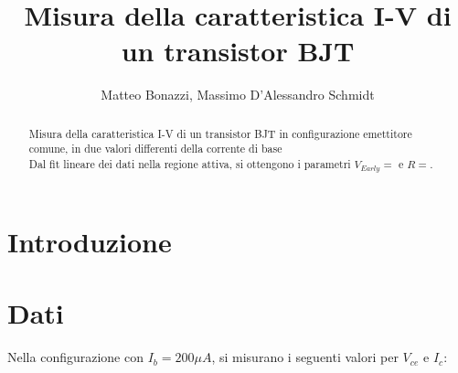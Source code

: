 \documentclass{article}
\title{Misura della caratteristica I-V di un transistor BJT}
\author{Matteo Bonazzi, Massimo D'Alessandro Schmidt}
\begin{document}
\maketitle
\begin{abstract}
    Misura della caratteristica I-V di un transistor BJT in configurazione emettitore comune, in due valori differenti della corrente di base \\
    Dal fit lineare dei dati nella regione attiva, si ottengono i parametri $V_{Early}=$ e $R=$.
\end{abstract}

\section{Introduzione}

\section{Dati}
Nella configurazione con $I_b=200\mu A$, si misurano i seguenti valori per $V_{ce}$ e $I_c$:
\end{document}
